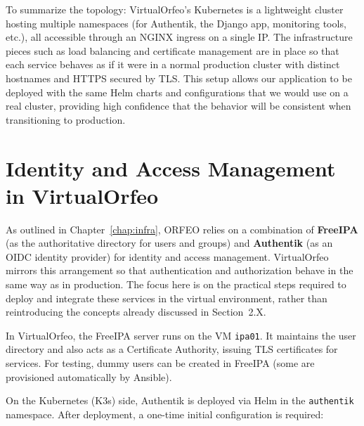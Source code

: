 \medskip

To summarize the topology: VirtualOrfeo’s Kubernetes is a lightweight cluster
hosting multiple namespaces (for Authentik, the Django app, monitoring tools,
etc.), all accessible through an NGINX ingress on a single IP. The infrastructure
pieces such as load balancing and certificate management are in place so that
each service behaves as if it were in a normal production cluster with distinct
hostnames and HTTPS secured by TLS. This setup allows our application to be
deployed with the same Helm charts and configurations that we would use on a
real cluster, providing high confidence that the behavior will be consistent when
transitioning to production.


\section{Identity and Access Management in VirtualOrfeo} \label{sec:virtualorfeo-iam}

As outlined in Chapter~\ref{chap:infra}, ORFEO relies on a combination of 
\textbf{FreeIPA} (as the authoritative directory for users and groups) and 
\textbf{Authentik} (as an OIDC identity provider) for identity and access 
management. VirtualOrfeo mirrors this arrangement so that authentication and 
authorization behave in the same way as in production. The focus here is on 
the practical steps required to deploy and integrate these services in the 
virtual environment, rather than reintroducing the concepts already discussed 
in Section~2.X. 

\medskip

In VirtualOrfeo, the FreeIPA server runs on the VM \texttt{ipa01}. It maintains 
the user directory and also acts as a Certificate Authority, issuing TLS 
certificates for services. For testing, dummy users can be created in FreeIPA 
(some are provisioned automatically by Ansible).  

On the Kubernetes (K3s) side, Authentik is deployed via Helm in the 
\texttt{authentik} namespace. After deployment, a one-time initial configuration 
is required:

